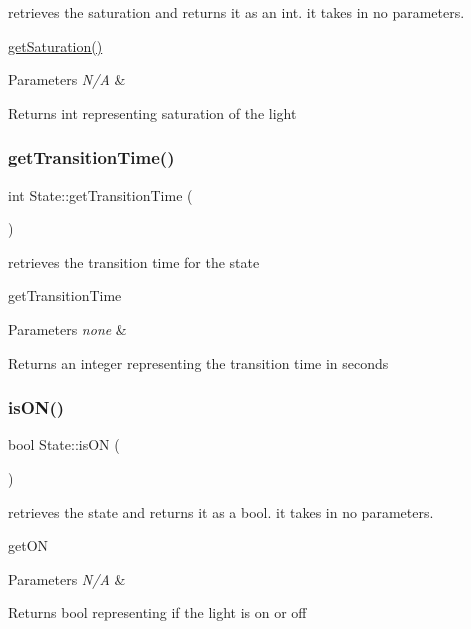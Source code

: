 retrieves the saturation and returns it as an int. it takes in no parameters. 

\hyperlink{class_state_aacba45740c95cd6a8efa6a441e90b1f4}{get\+Saturation()} 
\begin{DoxyParams}{Parameters}
{\em N/A} & \\
\hline
\end{DoxyParams}
\begin{DoxyReturn}{Returns}
int representing saturation of the light 
\end{DoxyReturn}
\mbox{\label{class_state_ac91f9f2eb66b235470e54dbeec0bc3da}} 
\subsubsection{\texorpdfstring{get\+Transition\+Time()}{getTransitionTime()}}
{\footnotesize\ttfamily int State\+::get\+Transition\+Time (\begin{DoxyParamCaption}{ }\end{DoxyParamCaption})}



retrieves the transition time for the state 

get\+Transition\+Time 
\begin{DoxyParams}{Parameters}
{\em none} & \\
\hline
\end{DoxyParams}
\begin{DoxyReturn}{Returns}
an integer representing the transition time in seconds 
\end{DoxyReturn}
\mbox{\label{class_state_a51fd7ff4c5635fc399646af9d2d87aa9}} 
\subsubsection{\texorpdfstring{is\+O\+N()}{isON()}}
{\footnotesize\ttfamily bool State\+::is\+ON (\begin{DoxyParamCaption}{ }\end{DoxyParamCaption})}



retrieves the state and returns it as a bool. it takes in no parameters. 

get\+ON 
\begin{DoxyParams}{Parameters}
{\em N/A} & \\
\hline
\end{DoxyParams}
\begin{DoxyReturn}{Returns}
bool representing if the light is on or off 
\end{DoxyReturn}
\mbox{\label{class_state_a58b256ffbe7d3475ac808a7f3d3214c0}} 
